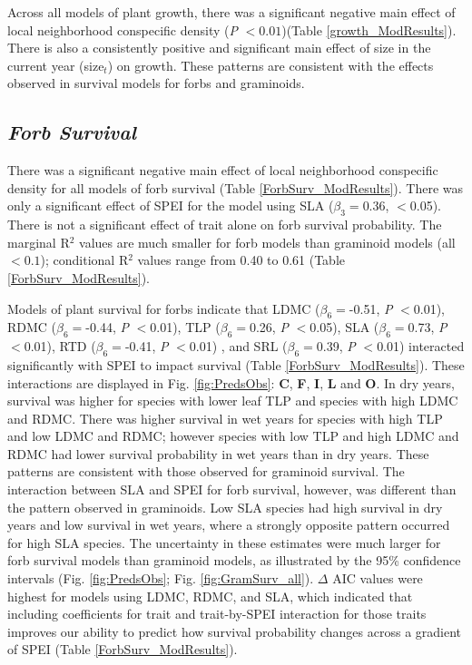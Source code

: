 \documentclass[12pt, letterpaper]{article}
\begin{document}
 Across all models of plant growth, there was a significant negative main effect of local neighborhood conspecific density (\textit{P} $<0.01$)(Table \ref{growth_ModResults}). There is also a consistently positive and significant main effect of size in the current year (size$_t$) on growth. These patterns are consistent with the effects observed in survival models for forbs and graminoids. 

\subsection{\textit{Forb Survival}} There was a significant negative main effect of local neighborhood conspecific density for all models of forb survival (Table \ref{ForbSurv_ModResults}). There was only a significant effect of SPEI for the model using SLA ($\beta_3=$0.36, $<$0.05). There is not a significant effect of trait alone on forb survival probability. The marginal R$^2$ values are much smaller for forb models than graminoid models (all $<0.1$);  conditional R$^2$ values range from 0.40 to 0.61 (Table \ref{ForbSurv_ModResults}).

Models of plant survival for forbs indicate that LDMC ($\beta_6=$-0.51,  \textit{P} $<$0.01), RDMC ($\beta _6=$-0.44,  \textit{P} $<$0.01), TLP ($\beta _6=$0.26,  \textit{P} $<$0.05), SLA ($\beta _6=$0.73,  \textit{P} $<$0.01), RTD ($\beta _6=$-0.41,  \textit{P} $<$0.01) , and SRL ($\beta _6=$0.39,  \textit{P} $<$0.01) interacted significantly with SPEI to impact survival (Table \ref{ForbSurv_ModResults}). These interactions are displayed in Fig. \ref{fig:PredsObs}: \textbf{C}, \textbf{F}, \textbf{I}, \textbf{L} and \textbf{O}. In dry years, survival was higher for species with lower leaf TLP and species with high LDMC and RDMC. There was higher survival in wet years for species with high TLP and low LDMC and RDMC; however species with low TLP and high LDMC and RDMC had lower survival probability in wet years than in dry years. These patterns are consistent with those observed for graminoid survival. The interaction between SLA and SPEI for forb survival, however, was different than the pattern observed in graminoids. Low SLA species had high survival in dry years and low survival in wet years, where a strongly opposite pattern occurred for high SLA species. The  uncertainty in these estimates were much larger for forb survival models than graminoid models, as illustrated by the 95\% confidence intervals (Fig. \ref{fig:PredsObs}; Fig. \ref{fig:GramSurv_all}). $\Delta$ AIC values were highest for models using LDMC, RDMC, and SLA, which indicated that including coefficients for trait and trait-by-SPEI interaction for those traits improves our ability to predict how survival probability changes across a gradient of SPEI (Table \ref{ForbSurv_ModResults}). 
\end{document}
